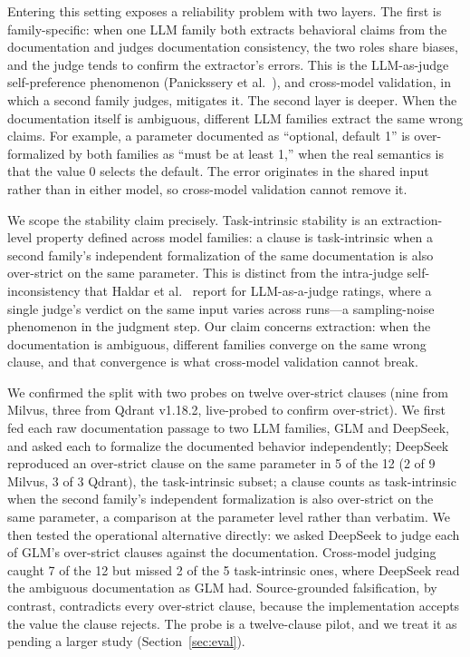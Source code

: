 \documentclass[sigconf]{acmart}
\begin{document}
Entering this setting exposes a reliability problem with two layers. The first is family-specific: when one LLM family both extracts behavioral claims from the documentation and judges documentation consistency, the two roles share biases, and the judge tends to confirm the extractor's errors. This is the LLM-as-judge self-preference phenomenon (Panickssery et al.~\cite{panickssery24}), and cross-model validation, in which a second family judges, mitigates it. The second layer is deeper. When the documentation itself is ambiguous, different LLM families extract the same wrong claims. For example, a parameter documented as ``optional, default 1'' is over-formalized by both families as ``must be at least 1,'' when the real semantics is that the value 0 selects the default. The error originates in the shared input rather than in either model, so cross-model validation cannot remove it.

We scope the stability claim precisely. Task-intrinsic stability is an extraction-level property defined across model families: a clause is task-intrinsic when a second family's independent formalization of the same documentation is also over-strict on the same parameter. This is distinct from the intra-judge self-inconsistency that Haldar et al.~\cite{haldar25} report for LLM-as-a-judge ratings, where a single judge's verdict on the same input varies across runs---a sampling-noise phenomenon in the judgment step. Our claim concerns extraction: when the documentation is ambiguous, different families converge on the same wrong clause, and that convergence is what cross-model validation cannot break.

We confirmed the split with two probes on twelve over-strict clauses (nine from Milvus, three from Qdrant v1.18.2, live-probed to confirm over-strict). We first fed each raw documentation passage to two LLM families, GLM and DeepSeek, and asked each to formalize the documented behavior independently; DeepSeek reproduced an over-strict clause on the same parameter in 5 of the 12 (2 of 9 Milvus, 3 of 3 Qdrant), the task-intrinsic subset; a clause counts as task-intrinsic when the second family's independent formalization is also over-strict on the same parameter, a comparison at the parameter level rather than verbatim. We then tested the operational alternative directly: we asked DeepSeek to judge each of GLM's over-strict clauses against the documentation. Cross-model judging caught 7 of the 12 but missed 2 of the 5 task-intrinsic ones, where DeepSeek read the ambiguous documentation as GLM had. Source-grounded falsification, by contrast, contradicts every over-strict clause, because the implementation accepts the value the clause rejects. The probe is a twelve-clause pilot, and we treat it as pending a larger study (Section~\ref{sec:eval}).
\end{document}
